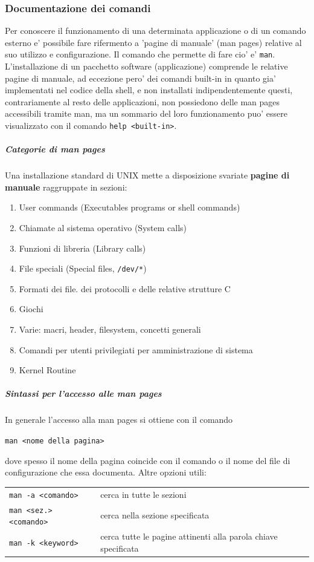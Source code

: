 {\pagebreak}

\subsubsection{Documentazione dei comandi}
Per conoscere il funzionamento di una determinata applicazione o di un comando esterno e' possibile fare 
rifermento a 'pagine di manuale' (man pages) relative al suo utilizzo e configurazione. 
Il comando che permette di fare cio' e' \texttt{man}. L'installazione di un pacchetto software (applicazione)
comprende le relative pagine di manuale, ad eccezione pero' dei comandi built-in in quanto gia' implementati 
nel codice della shell, e non installati indipendentemente questi, contrariamente al resto delle 
applicazioni, non possiedono delle man pages accessibili tramite man, ma un sommario del loro funzionamento puo'
essere visualizzato con il comando \texttt{help <built-in>}.

\subparagraph{Categorie di man pages}
Una installazione standard di UNIX mette a disposizione svariate \textbf{pagine di manuale} raggruppate in
sezioni:
	\begin{enumerate}
		\item User commands (Executables programs or shell commands)
		\item Chiamate al sistema operativo (System calls)
		\item Funzioni di libreria (Library calls)
		\item File speciali (Special files, \texttt{/dev/*})
		\item Formati dei file. dei protocolli e delle relative strutture C
		\item Giochi
		\item Varie: macri, header, filesystem, concetti generali
		\item Comandi per utenti privilegiati per amministrazione di sistema
		\item Kernel Routine
	\end{enumerate}

\subparagraph{Sintassi per l'accesso alle man pages}
In generale l'accesso alla man pages si ottiene con il comando \\
\begin{center}
	\texttt{man <nome della pagina>}
\end{center}
dove spesso il nome della pagina coincide con il comando o il nome del file di configurazione che essa documenta.
Altre opzioni utili:
\begin{center}
\begin{tabular}{ll}
	\texttt{man -a <comando>} & cerca in tutte le sezioni \\
	\texttt{man <sez.> <comando>} & cerca nella sezione specificata \\
	\texttt{man -k <keyword>} & cerca tutte le pagine attinenti alla parola chiave specificata \\
\end{tabular}
	
\end{center}

